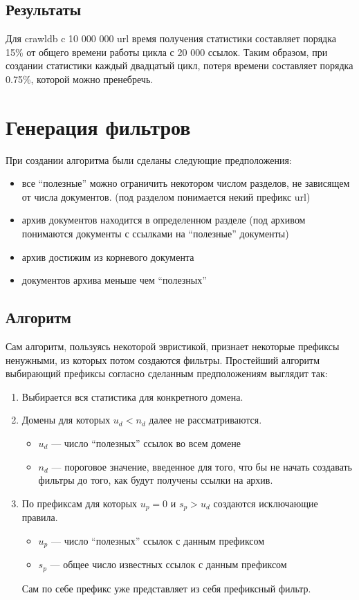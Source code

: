 \subsection*{Результаты}
Для crawldb c 10 000 000 url время получения статистики составляет порядка 15\% от общего времени работы цикла с 20 000 ссылок. Таким образом, при создании статистики каждый двадцатый цикл, потеря времени составляет порядка 0.75\%, которой  можно пренебречь.

\section*{Генерация фильтров}
При создании алгоритма были сделаны следующие предположения:
\begin{itemize}
 \item все ``полезные'' можно ограничить некотором числом разделов, не зависящем от числа документов. (под разделом понимается некий префикс url)
 \item архив документов находится в определенном разделе (под архивом понимаются документы с ссылками на ``полезные'' документы)
 \item архив достижим из корневого документа
 \item документов архива меньше чем ``полезных''
\end{itemize}

\subsection*{Алгоритм}
Сам алгоритм, пользуясь некоторой эвристикой, признает некоторые префиксы ненужными, из которых потом создаются фильтры.
Простейший алгоритм выбирающий префиксы согласно сделанным предположениям выглядит так:
\begin{enumerate}
 \item Выбирается вся статистика для конкретного домена.
 \item Домены для которых $u_{d}<n_{d}$ далее не рассматриваются.
 \begin{itemize}
  \item $u_{d}$ --- число ``полезных'' ссылок во всем домене
  \item $n_{d}$ --- пороговое значение, введенное для того, что бы не начать создавать фильтры до того, как будут получены ссылки на архив.
 \end{itemize}

 \item По префиксам для которых $u_{p}=0$ и $s_{p}>u_{d}$ создаются исключающие правила.
 \begin{itemize}
  \item $u_{p}$ --- число ``полезных'' ссылок с данным префиксом
  \item $s_{p}$ --- общее число известных ссылок с данным префиксом
 \end{itemize}
 Сам по себе префикс уже представляет из себя префиксный фильтр.
\end{enumerate}


